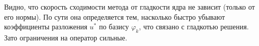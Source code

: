 \documentclass{trlnotes}
\begin{document}
    \begin{rem}
        Видно, что скорость сходимости метода от гладкости ядра не зависит (только от его нормы). По сути она определяется тем, насколько быстро убывают коэффициенты разложения $u^*$ по базису $\varphi_k$, что связано с гладкотью решения. Зато ограничения на оператор сильные.
    \end{rem}
\end{document}

